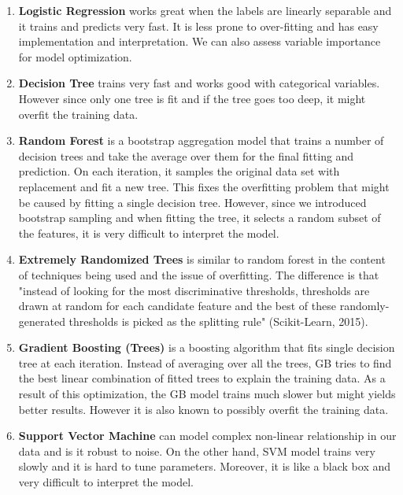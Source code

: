 \documentclass[11pt]{article}
\begin{document}
\begin{enumerate}[(1)]
\setlength\itemsep{0cm}
\item \textbf{Logistic Regression} works great when the labels are linearly separable and it trains and predicts very fast. It is less prone to over-fitting and has easy implementation and interpretation. We can also assess variable importance for model optimization.

\item \textbf{Decision Tree} trains very fast and works good with categorical variables. However since only one tree is fit and if the tree goes too deep, it might overfit the training data.

\item \textbf{Random Forest} is a bootstrap aggregation model that trains a number of decision trees and take the average over them for the final fitting and prediction. On each iteration, it samples the original data set with replacement and fit a new tree. This fixes the overfitting problem that might be caused by fitting a single decision tree. However, since we introduced bootstrap sampling and when fitting the tree, it selects a random subset of the features, it is very difficult to interpret the model.

\item \textbf{Extremely Randomized Trees} is similar to random forest in the content of techniques being used and the issue of overfitting. The difference is that "instead of looking for the most discriminative thresholds, thresholds are drawn at random for each candidate feature and the best of these randomly-generated thresholds is picked as the splitting rule" (Scikit-Learn, 2015).

\item \textbf{Gradient Boosting (Trees)} is a boosting algorithm that fits single decision tree at each iteration. Instead of averaging over all the trees, GB tries to find the best linear combination of fitted trees to explain the training data. As a result of this optimization, the GB model trains much slower but might yields better results. However it is also known to possibly overfit the training data.

\item \textbf{Support Vector Machine} can model complex non-linear relationship in our data and is it robust to noise. On the other hand, SVM model trains very slowly and it is hard to tune parameters. Moreover, it is like a black box and very difficult to interpret the model.


\end{enumerate}
\end{document}
